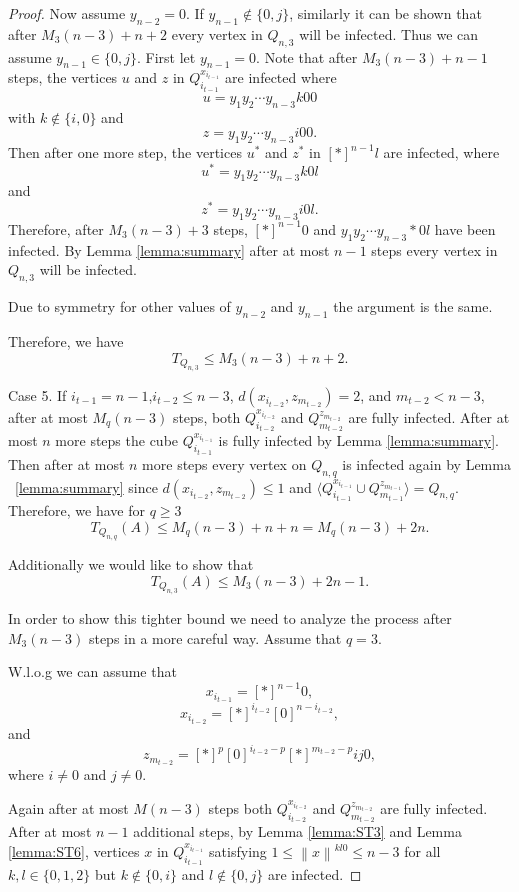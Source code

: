 \documentclass[reqno,11pt]{amsart}
\renewcommand{\leq}{\leqslant}
\renewcommand{\geq}{\geqslant}
\begin{document}
\begin{proof}
Now assume $y_{n-2}=0$. If $y_{n-1} \notin \{0,j\}$, similarly it can be shown that after $M_3(n-3)+n+2$ every vertex in $Q_{n,3}$ will be infected. Thus we can assume $y_{n-1} \in \{0,j\}$. First let $y_{n-1}=0$. Note that after $M_3(n-3)+n-1$ steps, the vertices $u$ and $z$ in $Q_{i_{t-1}}^{x_{i_{t-1}}}$ are infected where 
$$u=y_1y_2 \cdots y_{n-3}k00$$
with $k \notin\{i,0\}$
and 
$$z=y_1y_2 \cdots y_{n-3}i00.$$
Then after one more step, the vertices $u^*$ and $z^*$ in $[\ast]^{n-1}l$ are infected, where 
$$u^*=y_1y_2 \cdots y_{n-3}k0l$$
and 
$$z^*=y_1y_2 \cdots y_{n-3}i0l.$$
Therefore, after $M_3(n-3)+3$ steps, $[\ast]^{n-1}0$ and $y_1y_2\cdots y_{n-3}\ast 0l$ have been infected. By Lemma \ref{lemma:summary} after at most $n-1$ steps every vertex in $Q_{n,3}$ will be infected. 

Due to symmetry for other values of $y_{n-2}$ and $y_{n-1}$ the argument is the same. 

Therefore, we have 
$$T_{Q_{n,3}} \leq M_3(n-3)+n+2.$$


Case 5. If $i_{t-1}=n-1$,$i_{t-2} \leq n-3$, $d(x_{i_{t-2}},z_{m_{t-2}})=2$, and $m_{t-2} < n-3$, after at most $M_q(n-3)$ steps, both $Q_{i_{t-2}}^{x_{i_{t-2}}}$ and $Q_{m_{t-2}}^{z_{m_{t-2}}}$ are fully infected. After at most $n$ more steps the cube $Q_{i_{t-1}}^{x_{i_{t-1}}}$ is fully infected by Lemma \ref{lemma:summary}. Then after at most $n$ more 
steps every vertex on $Q_{n,q}$ is infected again by Lemma ~\ref{lemma:summary} since $d(x_{i_{t-2}},z_{m_{t-2}}) \leq 1$ and $\langle Q_{i_{t-1}}^{x_{i_{t-1}}} \cup Q_{m_{t-1}}^{z_{m_{t-1}}} \rangle=Q_{n,q}.$ Therefore, we have for $q \geq 3$
$$T_{Q_{n,q}}(A) \leq M_q(n-3)+n+n=M_q(n-3)+2n.$$

Additionally we would like to show that 
$$T_{Q_{n,3}}(A) \leq M_3(n-3)+2n-1.$$

In order to show this tighter bound we need to analyze the process after $M_3(n-3)$ steps in a more careful way. Assume that $q=3$. 

W.l.o.g we can assume that 
$$x_{i_{t-1}}=[\ast]^{n-1}0,$$
$$x_{i_{t-2}}=[\ast]^{i_{t-2}}[0]^{n-i_{t-2}},$$
and 
$$z_{m_{t-2}}=[\ast]^p[0]^{i_{t-2}-p}[\ast]^{m_{t-2}-p}ij0,$$
where $i \neq 0$ and $j \neq 0$.

Again after at most $M(n-3)$ steps both $Q_{i_{t-2}}^{x_{i_{t-2}}}$ and $Q_{m_{t-2}}^{z_{m_{t-2}}}$ are fully infected. After at most $n-1$ additional steps, by Lemma \ref{lemma:ST3} and Lemma \ref{lemma:ST6}, vertices $x$ in $Q_{i_{t-1}}^{x_{i_{t-1}}}$ satisfying $ 1 \leq \left \lVert x \right \rVert^{kl0} \leq n-3$  for all $k,l\in \{0,1,2\}$ but $k \notin \{0,i\}$ and $l \notin \{0,j\}$ are infected.


\end{proof}
\end{document}
